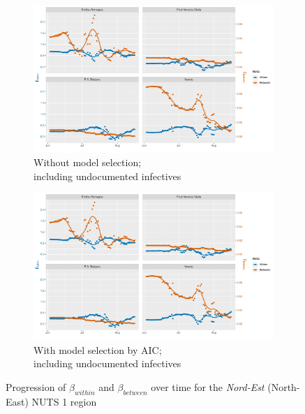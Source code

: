 \documentclass[12pt]{article}
\begin{document}
    \begin{figure}[H]\ContinuedFloat
	    \begin{subfigure}{\textwidth}
	      \centering
	      \includegraphics[width=0.95\linewidth]{output/model3_lag3_betas_Nord-Est_UndocQuadratic_rolling.pdf}
	      \caption{Without model selection; \\ including undocumented infectives}
	      \label{fig:beta_within_between_over_time_nordest_regular_undoc}
	    \end{subfigure}\newline
	    \begin{subfigure}{\textwidth}
	      \centering
	      \includegraphics[width=0.95\linewidth]{output/model3_lag3_betas_Nord-Est_aic_UndocQuadratic_rolling.pdf}
	      \caption{With model selection by AIC; \\ including undocumented infectives}
	      \label{fig:beta_within_between_over_time_nordest_aic_undoc}
	    \end{subfigure}
	    \caption{Progression of $\beta_{within}$ and $\beta_{between}$ over time for the \textit{Nord-Est} (North-East) NUTS 1 region}
	    \label{fig:beta_within_between_over_time_nordest}
    \end{figure}
	
\end{document}
